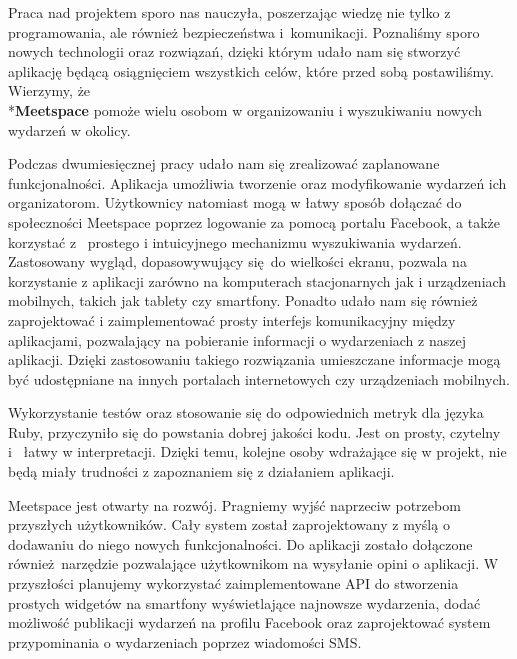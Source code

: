 Praca nad projektem sporo nas nauczyła, poszerzając wiedzę nie tylko z programowania, ale również bezpieczeństwa i~komunikacji.
Poznaliśmy sporo nowych technologii oraz rozwiązań, dzięki którym udało nam się stworzyć aplikację będącą osiągnięciem wszystkich celów, które przed sobą postawiliśmy.
Wierzymy, że \\*\textbf{Meetspace} pomoże wielu osobom w organizowaniu i wyszukiwaniu nowych wydarzeń w okolicy.

Podczas dwumiesięcznej pracy udało nam się zrealizować zaplanowane funkcjonalności.
Aplikacja umożliwia tworzenie oraz modyfikowanie wydarzeń ich organizatorom.
Użytkownicy natomiast mogą w łatwy sposób dołączać do społeczności Meetspace poprzez logowanie za pomocą portalu Facebook, a także korzystać z~ prostego i intuicyjnego mechanizmu wyszukiwania wydarzeń.
Zastosowany wygląd, dopasowywujący się do wielkości ekranu, pozwala na korzystanie z aplikacji zarówno na komputerach stacjonarnych jak i urządzeniach mobilnych, takich jak tablety czy smartfony.
Ponadto udało nam się również zaprojektować i zaimplementować prosty interfejs komunikacyjny między aplikacjami, pozwalający na pobieranie informacji o wydarzeniach z naszej aplikacji.
Dzięki zastosowaniu takiego rozwiązania umieszczane informacje mogą być udostępniane na innych portalach internetowych czy urządzeniach mobilnych.

Wykorzystanie testów oraz stosowanie się do odpowiednich metryk dla języka Ruby, przyczyniło się do powstania dobrej jakości kodu. Jest on prosty, czytelny i~ łatwy w interpretacji. Dzięki temu, kolejne osoby wdrażające się w projekt, nie będą miały trudności z zapoznaniem się z działaniem aplikacji.

Meetspace jest otwarty na rozwój. Pragniemy wyjść naprzeciw potrzebom przyszłych użytkowników. Cały system został zaprojektowany z myślą o dodawaniu do niego nowych funkcjonalności. Do aplikacji zostało dołączone również narzędzie pozwalające użytkownikom na wysyłanie opini o aplikacji.
W przyszłości planujemy wykorzystać zaimplementowane API do stworzenia prostych widgetów na smartfony wyświetlające najnowsze wydarzenia,
dodać możliwość publikacji wydarzeń na profilu Facebook oraz zaprojektować system przypominania o wydarzeniach poprzez wiadomości SMS.
